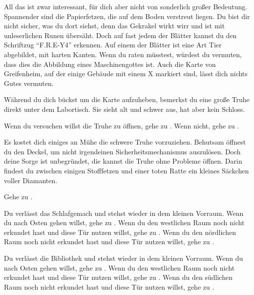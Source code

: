 All das ist zwar interessant, für dich aber nicht von sonderlich großer Bedeutung. Spannender sind die Papierfetzen, die auf dem Boden verstreut liegen. Du bist dir nicht sicher, was du dort siehst, denn das Gekrakel wirkt wirr und ist mit unleserlichen Runen übersäht. Doch auf fast jedem der Blätter kannst du den Schriftzug ``F.R.E-Y4'' erkennen. Auf einem der Blätter ist eine Art Tier abgebildet, mit harten Kanten. Wenn du raten müsstest, würdest du vermuten, dass dies die Abbildung eines Maschinengottes ist. Auch die Karte von Greifenheim, auf der einige Gebäude mit einem X markiert sind, lässt dich nichts Gutes vermuten.

Während du dich bückst um die Karte aufzuheben, bemerkst du eine große Truhe direkt unter dem Labortisch. Sie sieht alt und schwer aus, hat aber kein Schloss.

Wenn du versuchen willst die Truhe zu öffnen, gehe zu . Wenn nicht, gehe zu .


Es kostet dich einiges an Mühe die schwere Truhe vorzuziehen. Behutsam öffnest du den Deckel, um nicht irgendeinen Sicherheitsmechanismus auszulösen. Doch deine Sorge ist unbegründet, die kannst die Truhe ohne Probleme öffnen. Darin findest du zwischen einigen Stofffetzen und einer toten Ratte ein kleines Säckchen  voller Diamanten.

Gehe zu .


Du verlässt das Schlafgemach und stehst wieder in dem kleinen Vorraum. Wenn du nach Osten gehen willst, gehe zu .
Wenn du den westlichen Raum noch nicht erkundet hast und diese Tür nutzen willst, gehe zu .
Wenn du den nördlichen Raum noch nicht erkundet hast und diese Tür nutzen willst, gehe zu .


Du verlässt die Bibliothek und stehst wieder in dem kleinen Vorraum. Wenn du nach Osten gehen willst, gehe zu .
Wenn du den westlichen Raum noch nicht erkundet hast und diese Tür nutzen willst, gehe zu .
Wenn du den südlichen Raum noch nicht erkundet hast und diese Tür nutzen willst, gehe zu .

